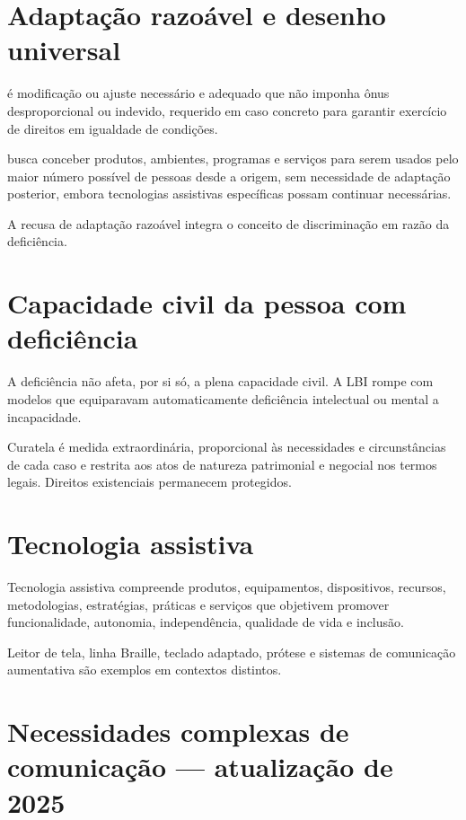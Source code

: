 \section{Adaptação razoável e desenho universal}

 é modificação ou ajuste necessário e adequado que não imponha ônus desproporcional ou indevido, requerido em caso concreto para garantir exercício de direitos em igualdade de condições.

 busca conceber produtos, ambientes, programas e serviços para serem usados pelo maior número possível de pessoas desde a origem, sem necessidade de adaptação posterior, embora tecnologias assistivas específicas possam continuar necessárias.

A recusa de adaptação razoável integra o conceito de discriminação em razão da deficiência.

\section{Capacidade civil da pessoa com deficiência}

A deficiência não afeta, por si só, a plena capacidade civil. A LBI rompe com modelos que equiparavam automaticamente deficiência intelectual ou mental a incapacidade.

Curatela é medida extraordinária, proporcional às necessidades e circunstâncias de cada caso e restrita aos atos de natureza patrimonial e negocial nos termos legais. Direitos existenciais permanecem protegidos.

\section{Tecnologia assistiva}

Tecnologia assistiva compreende produtos, equipamentos, dispositivos, recursos, metodologias, estratégias, práticas e serviços que objetivem promover funcionalidade, autonomia, independência, qualidade de vida e inclusão.

Leitor de tela, linha Braille, teclado adaptado, prótese e sistemas de comunicação aumentativa são exemplos em contextos distintos.

\section{Necessidades complexas de comunicação — atualização de 2025}

